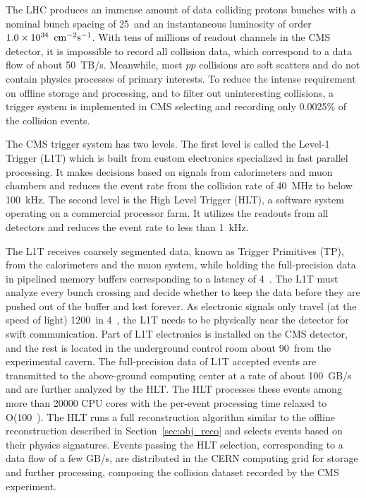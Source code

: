 The LHC produces an immense amount of data colliding protons bunches with a nominal bunch spacing of 25~\ns and an instantaneous luminosity of order $1.0 \times 10^{34}~\,\text{cm}^{-2}\text{s}^{-1}$. 
With tens of millions of readout channels in the CMS detector, it is impossible to record all collision data, which correspond to a data flow of about 50~TB/s. 
Meanwhile, most $pp$ collisions are soft scatters and do not contain physics processes of primary interests.
To reduce the intense requirement on offline storage and processing, and to filter out uninteresting collisions,
a trigger system is implemented in CMS selecting and recording only 0.0025\% of the collision events.

The CMS trigger system has two levels. 
The first level is called the Level-1 Trigger (L1T) which is built from custom electronics specialized in fast parallel processing.
It makes decisions based on signals from calorimeters and muon chambers and reduces the event rate from the collision rate of 40~MHz to below 100~kHz.
The second level is the High Level Trigger (HLT), a software system operating on a commercial processor farm.
It utilizes the readouts from all detectors and reduces the event rate to less than 1~kHz. 

The L1T receives coarsely segmented data, known as Trigger Primitives (TP), from the calorimeters and the muon system, 
while holding the full-precision data in pipelined memory buffers corresponding to a latency of 4~\mus.
The L1T must analyze every bunch crossing and decide whether to keep the data before they are pushed out of the buffer and lost forever.
As electronic signals only travel (at the speed of light) 1200~\meter in 4~\mus, the L1T needs to be physically near the detector for swift communication.
Part of L1T electronics is installed on the CMS detector, and the rest is located in the underground control room about 90~\meter from the experimental cavern.
The full-precision data of L1T accepted events are transmitted to the above-ground computing center at a rate of about 100~GB/s and are further analyzed by the HLT. 
The HLT processes these events among more than 20000 CPU cores with the per-event processing time relaxed to O(100~\ms).
The HLT runs a full reconstruction algorithm similar to the offline reconstruction described in Section~\ref{sec:obj_reco}
and selects events based on their physics signatures. 
Events passing the HLT selection, corresponding to a data flow of a few GB/s, 
are distributed in the CERN computing grid for storage and further processing,
composing the collision dataset recorded by the CMS experiment. 

